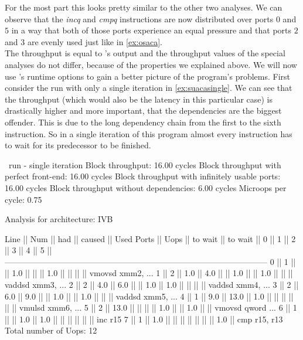For the most part this looks pretty similar to the other two analyses. We can observe that the \emph{incq} and \emph{cmpq} instructions are now distributed over ports $0$ and $5$ in a way that both of those ports experience an equal pressure and that ports $2$ and $3$ are evenly used just like in \autoref{ex:osaca}.\\
The throughput is equal to \iaca's output and the throughput values of the special analyses do not differ, because of the properties we explained above. We will now use \suaca's runtime options to gain a better picture of the program's problems. First consider the run with only a single iteration in \autoref{ex:suacasingle}. We can see that the throughput (which would also be the latency in this particular case) is drastically higher and more important, that the dependencies are the biggest offender. This is due to the long dependency chain from the first to the sixth instruction. So in a single iteration of this program almost every instruction has to wait for its predecessor to be finished.

\begin{LabeledExample}{\suaca\ run - single iteration}{\label{ex:suacasingle}}
    Block throughput: 16.00 cycles
    Block throughput with perfect front-end: 16.00 cycles
    Block throughput with infinitely usable ports: 16.00 cycles
    Block throughput without dependencies: 6.00 cycles
    Microops per cycle: 0.75
    
    Analysis for architecture: IVB
    
     Line  ||   Num   ||   had   || caused  ||            Used Ports
           ||   Uops  || to wait || to wait ||   0   ||   1   ||   2   ||   3   ||   4   ||   5   ||
     ------------------------------------------------------------------------------------------------
       0   ||    1    ||         ||   1.0   ||       ||       ||  1.0  ||       ||       ||       || vmovsd xmm2, ...
       1   ||    2    ||   1.0   ||   4.0   ||       ||  1.0  ||       ||  1.0  ||       ||       || vaddsd xmm3, ...
       2   ||    2    ||   4.0   ||   6.0   ||       ||  1.0  ||  1.0  ||       ||       ||       || vaddsd xmm4, ...
       3   ||    2    ||   6.0   ||   9.0   ||       ||  1.0  ||       ||  1.0  ||       ||       || vaddsd xmm5, ...
       4   ||    1    ||   9.0   ||  13.0   ||  1.0  ||       ||       ||       ||       ||       || vmulsd xmm6, ...
       5   ||    2    ||  13.0   ||         ||       ||       ||  1.0  ||       ||  1.0  ||       || vmovsd qword ...
       6   ||    1    ||         ||   1.0   ||  1.0  ||       ||       ||       ||       ||       || inc r15
       7   ||    1    ||   1.0   ||         ||       ||       ||       ||       ||       ||  1.0  || cmp r15, r13
    Total number of Uops: 12
\end{LabeledExample}

